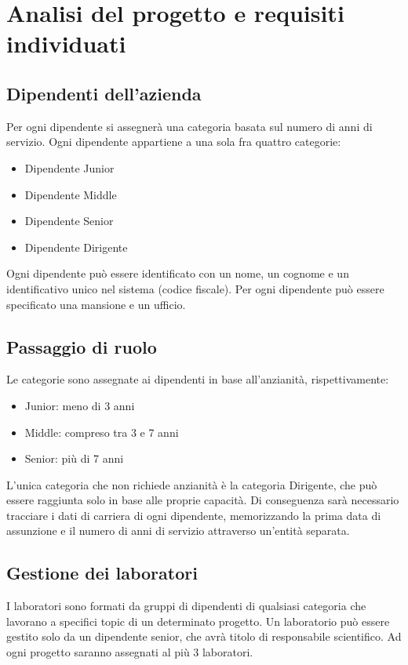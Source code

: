 \chapter{Analisi del progetto e requisiti individuati}
\section{Dipendenti dell'azienda}
Per ogni dipendente si assegnerà una categoria basata sul numero di anni di servizio. Ogni dipendente appartiene a una sola fra quattro categorie:
\begin{itemize}
    \item Dipendente Junior
    \item Dipendente Middle
    \item Dipendente Senior
    \item Dipendente Dirigente
\end{itemize}
Ogni dipendente può essere identificato con un nome, un cognome e un identificativo unico nel sistema (codice fiscale). Per ogni dipendente può essere specificato una mansione e un ufficio.

\section{Passaggio di ruolo}
Le categorie sono assegnate ai dipendenti in base all'anzianità, rispettivamente:
\begin{itemize}
    \item Junior: meno di 3 anni
    \item Middle: compreso tra 3 e 7 anni
    \item Senior: più di 7 anni
\end{itemize}
L'unica categoria che non richiede anzianità è la categoria Dirigente, che può essere raggiunta solo in base alle proprie capacità.
Di conseguenza sarà necessario tracciare i dati di carriera di ogni dipendente, memorizzando la prima data di assunzione e il numero di anni di servizio attraverso un'entità separata. 

\section{Gestione dei laboratori}
I laboratori sono formati da gruppi di dipendenti di qualsiasi categoria che lavorano a specifici topic di un determinato progetto. Un laboratorio può essere gestito solo da un dipendente senior, che avrà titolo di responsabile scientifico. Ad ogni progetto saranno assegnati al più 3 laboratori.

